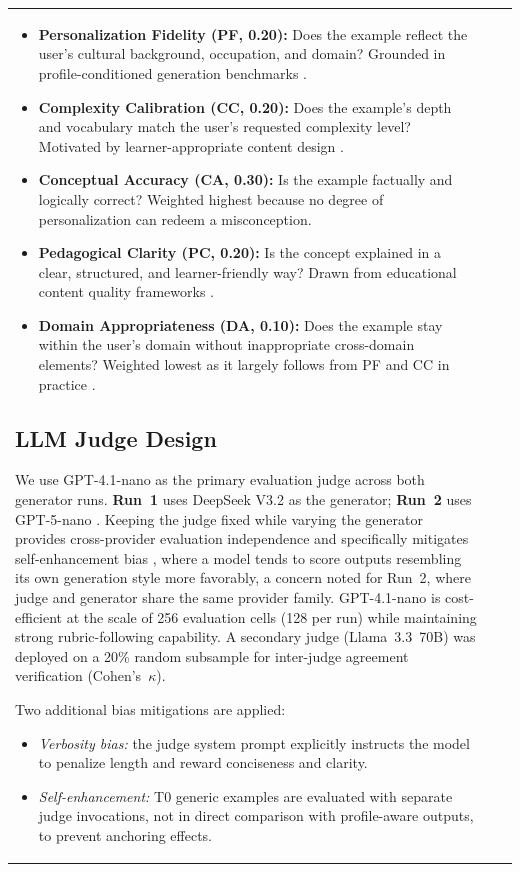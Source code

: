 \documentclass[conference]{IEEEtran}
\begin{document}
\begin{table}[htbp]
\begin{center}
\begin{tabular}{lll}
\begin{itemize}
    \item \textbf{Personalization Fidelity (PF, 0.20):} Does the example reflect the user's cultural background, occupation, and domain? Grounded in profile-conditioned generation benchmarks \cite{b3, b8}.
    \item \textbf{Complexity Calibration (CC, 0.20):} Does the example's depth and vocabulary match the user's requested complexity level? Motivated by learner-appropriate content design \cite{b13}.
    \item \textbf{Conceptual Accuracy (CA, 0.30):} Is the example factually and logically correct? Weighted highest because no degree of personalization can redeem a misconception.
    \item \textbf{Pedagogical Clarity (PC, 0.20):} Is the concept explained in a clear, structured, and learner-friendly way? Drawn from educational content quality frameworks \cite{b4, b13}.
    \item \textbf{Domain Appropriateness (DA, 0.10):} Does the example stay within the user's domain without inappropriate cross-domain elements? Weighted lowest as it largely follows from PF and CC in practice \cite{b13}.
\end{itemize}


\subsection{LLM Judge Design}

We use GPT-4.1-nano as the primary evaluation judge across both generator runs. \textbf{Run~1} uses DeepSeek V3.2 \cite{b14} as the generator; \textbf{Run~2} uses GPT-5-nano \cite{b15}. Keeping the judge fixed while varying the generator provides cross-provider evaluation independence and specifically mitigates self-enhancement bias \cite{b11}, where a model tends to score outputs resembling its own generation style more favorably, a concern noted for Run~2, where judge and generator share the same provider family. GPT-4.1-nano is cost-efficient at the scale of 256 evaluation cells (128 per run) while maintaining strong rubric-following capability. A secondary judge (Llama~3.3~70B) was deployed on a 20\% random subsample for inter-judge agreement verification (Cohen's~$\kappa$).

Two additional bias mitigations are applied:
\begin{itemize}

    \item \textit{Verbosity bias:} the judge system prompt explicitly instructs the model to penalize length and reward conciseness and clarity.
    \item \textit{Self-enhancement:} T0 generic examples are evaluated with separate judge invocations, not in direct comparison with profile-aware outputs, to prevent anchoring effects.
\end{itemize}


\end{tabular}
\end{center}
\end{table}
\end{document}
